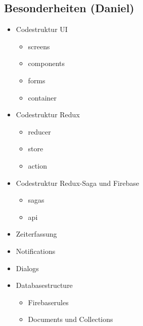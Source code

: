 \subsection{Besonderheiten (Daniel)}
\begin{itemize}
    \item Codestruktur UI
    \begin{itemize}
        \item screens
        \item components
        \item forms
        \item container
    \end{itemize}
    \item Codestruktur Redux
    \begin{itemize}
        \item reducer
        \item store
        \item action
    \end{itemize}
    \item Codestruktur Redux-Saga und Firebase
    \begin{itemize}
        \item sagas
        \item api
    \end{itemize}
    \item Zeiterfassung
    \item Notifications
    \item Dialogs
    \item Databasestructure
    \begin{itemize}
        \item Firebaserules
        \item Documents und Collections
    \end{itemize}
\end{itemize}
